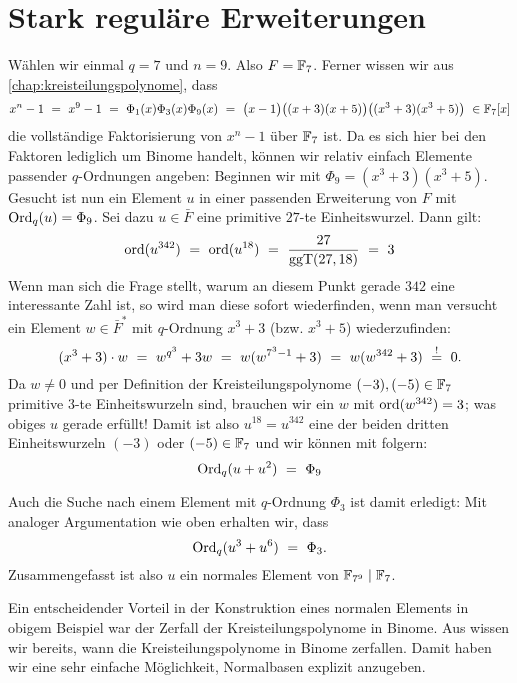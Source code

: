 \section{Stark reguläre Erweiterungen}
\label{sec:stark_regulare_erweiterungen}

\begin{beispiel}
  \label{bsp:stark_regular_1}
  Wählen wir einmal $q = 7$ und $n=9$. Also $F = \mathbb{F}_7$.
  Ferner wissen wir aus \autoref{chap:kreisteilungspolynome}, dass
  \[ x^n-1 \ =\  x^9-1 \ =\  
    \Phi_1(x)\Phi_3(x)\Phi_9(x) \ =\ 
    \big(x-1\big)\big( (x+3)(x+5)\big)
    \big( (x^3+3)(x^3+5) \big) \ \in \mathbb{F}_7[x]\]
  die vollständige Faktorisierung von $x^n-1$ über $\mathbb{F}_7$ ist.
  Da es sich hier bei den Faktoren lediglich um Binome handelt, können wir
  relativ einfach Elemente passender $q$-Ordnungen angeben: Beginnen wir 
  mit $\Phi_9 = (x^3+3)(x^3+5)$. Gesucht ist nun ein Element $u$ in einer 
  passenden Erweiterung von $F$ mit $\operatorname{Ord}_q(u)= \Phi_9$.
  Sei dazu $u \in \bar F$ eine primitive $27$-te Einheitswurzel. Dann
  gilt:
  \[ \operatorname{ord}(u^{342}) \ =\  \operatorname{ord}(u^{18}) \ =\  \frac{27}{\operatorname{ggT}(27,18)} \ =\  3\]
  Wenn man sich die Frage stellt, warum an diesem Punkt gerade $342$ eine
  interessante Zahl ist, so wird man diese sofort wiederfinden, wenn man
  versucht ein Element $w\in \bar F^\ast$ mit $q$-Ordnung $x^3+3$ (bzw.
  $x^3+5$) wiederzufinden:
  \[ (x^3+3)\cdot w \ =\  w^{q^3} + 3 w \ =\  
    w(w^{7^3-1} +3) \ =\  w(w^{342}+3) \ \overset{!}{=}\  0.\]
  Da $w \neq 0$ und per Definition der Kreisteilungspolynome 
  $(-3),(-5)\in \mathbb{F}_7$ primitive $3$-te Einheitswurzeln sind, 
  brauchen wir ein $w$ mit $\operatorname{ord}(w^{342}) = 3$; 
  was obiges $u$ gerade erfüllt! Damit ist also $u^{18} = u^{342}$ 
  eine der beiden dritten Einheitswurzeln $(-3)$ oder $(-5) \in \mathbb{F}_7$ und wir
  können mit  folgern:
  \[ \operatorname{Ord}_q(u + u^2) \ =\  \Phi_9\]

  Auch die Suche nach einem Element mit $q$-Ordnung $\Phi_3$ ist damit
  erledigt: Mit analoger Argumentation wie oben erhalten wir, dass 
  \[ \operatorname{Ord}_q(u^{3} + u^{6}) \ =\  \Phi_3.\]
  Zusammengefasst ist also $u$ ein normales Element von $\mathbb{F}_{7^9} \mid \mathbb{F}_7$.
\end{beispiel}

Ein entscheidender Vorteil in der Konstruktion eines normalen Elements in
obigem Beispiel war der Zerfall der Kreisteilungspolynome in Binome. Aus 
wissen wir bereits, wann die Kreisteilungspolynome in Binome zerfallen.
Damit haben wir eine sehr einfache Möglichkeit, Normalbasen explizit anzugeben.

